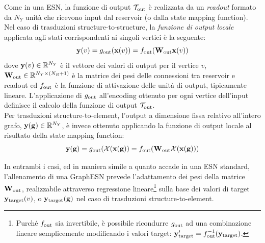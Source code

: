 Come in una ESN, la funzione di output $\mathcal{T}_\textup{out}$ è realizzata da un \emph{readout} formato da $N_Y$ unità che ricevono input dal reservoir (o dalla state mapping function). \\
Nel caso di trasduzioni structure-to-structure, la \emph{funzione di output locale} applicata agli stati corrispondenti ai singoli vertici è la seguente:
\begin{equation}
\vect{y}(v) = g_\textup{out}(\vect{x}(v)) = f_\textup{out}(\matr{W}_\textup{out} \vect{x}(v))
\end{equation}
dove $\mathbf{y}(v) \in \mathbb{R}^{N_Y}$ è il vettore dei valori di output per il vertice $v$, $\matr{W}_\textup{out} \in \R^{N_Y \times (N_R + 1)}$ è la matrice dei pesi delle connessioni tra reservoir e readout ed $f_\textup{out}$ è la funzione di attivazione delle unità di output, tipicamente lineare. L'applicazione di $g_\textup{out}$ all'encoding ottenuto per ogni vertice dell'input definisce il calcolo della funzione di output $\mathcal{T}_\textup{out}$.\\
Per trasduzioni structure-to-element, l'output a dimensione fissa relativo all'intero grafo, $\mathbf{y}(\mathbf{g}) \in \mathbb{R}^{N_Y}$, è invece ottenuto applicando la funzione di output locale al risultato della state mapping function: 
\begin{equation}
\vect{y}(\graph{g}) = g_\textup{out}(\mathcal{X}(\vect{x}(\graph{g})) = f_\textup{out}(\matr{W}_\textup{out} \mathcal{X}(\vect{x}(\graph{g})))
\end{equation}

In entrambi i casi, ed in maniera simile a quanto accade in una ESN standard, l'allenamento di una GraphESN prevede l'adattamento dei pesi della matrice $\matr{W}_\textup{out}$, realizzabile attraverso regressione lineare\footnote{Purché $f_\textup{out}$ sia invertibile, è possibile ricondurre $g_\textup{out}$ ad una combinazione lineare semplicemente modificando i valori target: $\mathbf{y}_\textup{target}' = f_\textup{out}^{-1}(\mathbf{y}_\textup{target})$.} sulla base dei valori di target $\mathbf{y}_\textup{target}(v)$, o $\mathbf{y}_\textup{target}(\mathbf{g})$ nel caso di trasduzioni structure-to-element. 

